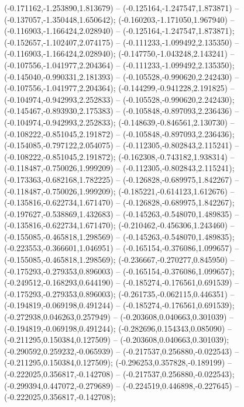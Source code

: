  (-0.171162,-1.253890,1.813679) -- (-0.125164,-1.247547,1.873871) -- (-0.137057,-1.350448,1.650642);
 (-0.160203,-1.171050,1.967940) -- (-0.116903,-1.166424,2.028940) -- (-0.125164,-1.247547,1.873871);
 (-0.152657,-1.102407,2.074175) -- (-0.111233,-1.099492,2.135350) -- (-0.116903,-1.166424,2.028940);
 (-0.147750,-1.043248,2.143241) -- (-0.107556,-1.041977,2.204364) -- (-0.111233,-1.099492,2.135350);
 (-0.145040,-0.990331,2.181393) -- (-0.105528,-0.990620,2.242430) -- (-0.107556,-1.041977,2.204364);
 (-0.144299,-0.941228,2.191825) -- (-0.104974,-0.942993,2.252833) -- (-0.105528,-0.990620,2.242430);
 (-0.145467,-0.893930,2.175383) -- (-0.105848,-0.897093,2.236436) -- (-0.104974,-0.942993,2.252833);
 (-0.148639,-0.846561,2.130730) -- (-0.108222,-0.851045,2.191872) -- (-0.105848,-0.897093,2.236436);
 (-0.154085,-0.797122,2.054075) -- (-0.112305,-0.802843,2.115241) -- (-0.108222,-0.851045,2.191872);
 (-0.162308,-0.743182,1.938314) -- (-0.118487,-0.750026,1.999209) -- (-0.112305,-0.802843,2.115241);
 (-0.173363,-0.682168,1.782225) -- (-0.126828,-0.689975,1.842267) -- (-0.118487,-0.750026,1.999209);
 (-0.185221,-0.614123,1.612676) -- (-0.135816,-0.622734,1.671470) -- (-0.126828,-0.689975,1.842267);
 (-0.197627,-0.538869,1.432683) -- (-0.145263,-0.548070,1.489835) -- (-0.135816,-0.622734,1.671470);
 (-0.210462,-0.456306,1.243460) -- (-0.155085,-0.465818,1.298569) -- (-0.145263,-0.548070,1.489835);
 (-0.223553,-0.366601,1.046951) -- (-0.165154,-0.376086,1.099657) -- (-0.155085,-0.465818,1.298569);
 (-0.236667,-0.270277,0.845950) -- (-0.175293,-0.279353,0.896003) -- (-0.165154,-0.376086,1.099657);
 (-0.249512,-0.168293,0.644190) -- (-0.185274,-0.176561,0.691539) -- (-0.175293,-0.279353,0.896003);
 (-0.261735,-0.062115,0.446351) -- (-0.194819,-0.069198,0.491244) -- (-0.185274,-0.176561,0.691539);
 (-0.272938,0.046263,0.257949) -- (-0.203608,0.040663,0.301039) -- (-0.194819,-0.069198,0.491244);
 (-0.282696,0.154343,0.085090) -- (-0.211295,0.150384,0.127509) -- (-0.203608,0.040663,0.301039);
 (-0.290592,0.259232,-0.065939) -- (-0.217537,0.256880,-0.022543) -- (-0.211295,0.150384,0.127509);
 (-0.296253,0.357828,-0.189199) -- (-0.222025,0.356817,-0.142708) -- (-0.217537,0.256880,-0.022543);
 (-0.299394,0.447072,-0.279689) -- (-0.224519,0.446898,-0.227645) -- (-0.222025,0.356817,-0.142708);
